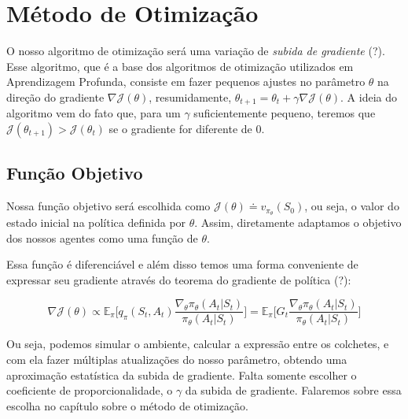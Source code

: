 \section{Método de Otimização}

O nosso algoritmo de otimização será uma variação de \textit{subida de gradiente} (?). Esse algoritmo,
que é a base dos algoritmos de otimização utilizados em Aprendizagem Profunda, consiste em fazer pequenos ajustes no parâmetro $\theta$ na direção do gradiente $\nabla \mathcal{J}(\theta)$, resumidamente, $\theta_{t + 1} = \theta_t + \gamma \nabla \mathcal{J}(\theta)$. A ideia do algoritmo vem do fato que, para um $\gamma$ suficientemente pequeno, teremos que $\mathcal{J}(\theta_{t+1}) > \mathcal{J}(\theta_{t})$ se o gradiente for diferente de 0.

\subsection{Função Objetivo}

Nossa função objetivo será escolhida como $\mathcal{J}(\theta) \doteq v_{\pi_{\theta}}(S_0)$, ou seja, o valor do estado inicial na política definida por $\theta$. Assim, diretamente adaptamos o objetivo dos nossos agentes como uma função de $\theta$.

Essa função é diferenciável e além disso temos uma forma conveniente de expressar seu gradiente através do teorema do gradiente de política (?):

\begin{equation}
    \nabla \mathcal{J}(\theta) 
    \propto \mathbb{E}_{\pi} \Big[ q_{\pi}(S_t, A_t) \frac{\nabla_{\theta} \pi_{\theta}(A_t | S_t)}{\pi_{\theta}(A_t | S_t)} \Big]
    = \mathbb{E}_{\pi} \Big[ G_t \frac{\nabla_{\theta} \pi_{\theta}(A_t | S_t)}{\pi_{\theta}(A_t | S_t)} \Big]
\end{equation}

Ou seja, podemos simular o ambiente, calcular a expressão entre os colchetes, e com ela fazer múltiplas atualizações do nosso parâmetro, obtendo uma aproximação estatística da subida de gradiente. Falta somente escolher o coeficiente de proporcionalidade, o $\gamma$ da subida de gradiente. Falaremos sobre essa escolha no capítulo sobre o método de otimização.

